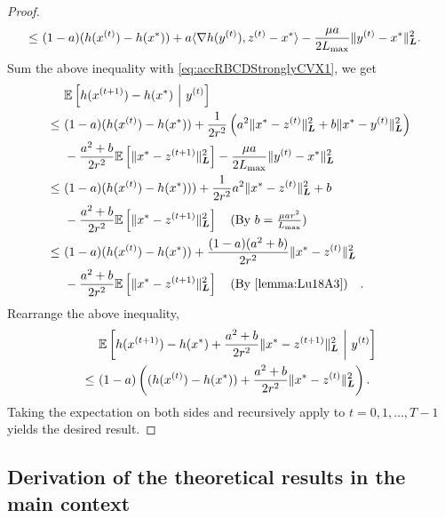 \begin{proof}
\begin{align*}
    \leq~& (1-a) ( h( x^{(t)} ) - h(x^*) ) + a \langle \nabla h( y^{(t)} ), z^{(t)} - x^* \rangle - \frac{\mu a}{2L_{\max}} \| y^{(t)} - x^* \|^2_{\boldsymbol{L}}.
\end{align*}
Sum the above inequality with \eqref{eq:accRBCDStronglyCVX1}, we get
\begin{align*}
    &\mE \left[ h( x^{(t+1)} ) - h(x^*) ~\Big|~ y^{(t)}  \right] \\
    \leq~& (1-a) ( h( x^{(t)} ) - h(x^{*}) ) + \frac{1}{2r^2} \left( a^2 \| x^* - z^{(t)} \|_{\bL}^2 + b \| x^* - y^{(t)} \|_{\bL}^2 \right)  \\
    & - \frac{a^2 + b}{2r^2} \mE \left[  \| x^* - z^{(t+1)} \|_{\bL}^2 \right] - \frac{\mu a}{2L_{\max}} \| y^{(t)} - x^* \|^2_{\bL} \\
    \leq~& (1-a) ( h( x^{(t)} ) - h(x^{*}) ) ) + \frac{1}{2r^2}  a^2 \| x^* - z^{(t)} \|_{\bL}^2 + b \\
    & - \frac{a^2 + b}{2r^2} \mE \left[  \| x^* - z^{(t+1)} \|_{\bL}^2 \right] \text{(By $b = \frac{\mu a r^2}{L_{\max}}$)} \\
    \leq~& (1-a) ( h( x^{(t)} ) - h(x^{*}) ) + \frac{(1-a)(a^2+b)}{2r^2}  \| x^* - z^{(t)} \|_{\bL}^2 \\
    &- \frac{a^2 + b}{2r^2} \mE \left[  \| x^* - z^{(t+1)} \|_{\bL}^2 \right] \text{(By \autoref{lemma:Lu18A3})}.
\end{align*}
Rearrange the above inequality,
\begin{align*}
    & \mathbb{E} \left[ h( x^{(t+1)} ) - h(x^*) + \frac{a^2 + b}{2r^2}  \| x^* - z^{(t+1)} \|_{\boldsymbol{L}}^2  ~\bigg|~ y^{(t)}   \right] \\
    \leq~& (1-a) \left( ( h( x^{(t)} ) - h(x^{*}) ) + \frac{a^2+b}{2r^2}  \| x^* - z^{(t)} \|_{\boldsymbol{L}}^2 \right).
\end{align*}
Taking the expectation on both sides and recursively apply to $t = 0, 1, \ldots, T-1$ yields the desired result.
\end{proof}

\subsection{Derivation of the theoretical results in the main context} \label{appendix:derivation_main_context}


